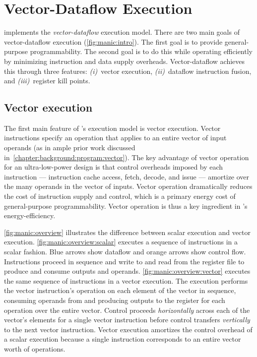 \section{Vector-Dataflow Execution}
\label{manic:design}

\manic implements the {\em vector-dataflow} execution model. There are
two main goals of vector-dataflow execution (\autoref{fig:manic:intro}).
The first goal is to provide general-purpose programmability.  The
second goal is to do this while operating efficiently by minimizing
instruction and data supply overheads.
%
Vector-dataflow achieves this through three features:
\emph{(i)}~vector execution,
\emph{(ii)}~dataflow instruction fusion, and
\emph{(iii)}~register kill points.

\figMANICOverview

\subsection{Vector execution}
The first main feature of \manic's execution model is vector execution. Vector
instructions specify an operation that applies to an entire vector of input
operands (as in ample prior work discussed in~\autoref{chapter:background:program:vector}).  The
key advantage of vector operation for an ultra-low-power design is that control overheads imposed by each
instruction --- instruction cache access, fetch, decode, and issue --- amortize
over the many operands in the vector of inputs.   Vector operation dramatically
reduces the cost of instruction supply and control, which is a primary energy cost of
general-purpose programmability.  Vector operation is thus a key ingredient in
\manic's energy-efficiency. 

\autoref{fig:manic:overview} illustrates the difference between scalar execution
and vector execution.
%
\autoref{fig:manic:overview:scalar} executes a sequence of instructions in a scalar fashion.
%
Blue arrows show dataflow and orange arrows show control flow.
%
Instructions proceed in sequence and write to and read from the register file
to produce and consume outputs and operands.
%
\autoref{fig:manic:overview:vector} executes the same sequence of instructions in a vector execution.
%
The execution performs the vector instruction's operation on each element of
the vector in sequence, consuming operands from and producing outputs to the
register for each operation over the entire vector.
%
Control proceeds {\em horizontally} across each of the vector's elements for a
single vector instruction before control transfers {\em vertically} to the next
vector instruction.
%
Vector execution amortizes the control overhead of a scalar execution because a
single instruction corresponds to an entire vector worth of operations.
%

